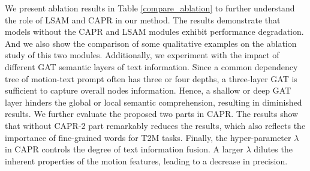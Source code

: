\documentclass[10pt,twocolumn,letterpaper]{article}
\begin{document}
\begin{table}[t]
\centering
{}

\caption{Experiment results on Harder-HumanML3D split from the HumanML3D~\cite{guo2022generating} test set. }

\label{ablation}
\end{table}
We present ablation results in Table \ref{compare_ablation} to further understand the role of LSAM and CAPR in our method. The results demonstrate that models without the CAPR and LSAM modules exhibit performance degradation. And we also show the comparison of some qualitative examples on the ablation study of this two modules. Additionally, we experiment with the impact of different GAT semantic layers of text information. Since a common dependency tree of motion-text prompt often has three or four depths, a three-layer GAT is sufficient to capture overall nodes information. Hence, a shallow or deep GAT layer hinders the global or local semantic comprehension, resulting in diminished results. We further evaluate the proposed two parts in CAPR. The results show that without CAPR-2 part remarkably reduces the results, which also reflects the importance of fine-grained words for T2M tasks. Finally, the hyper-parameter $\lambda$ in CAPR controls the degree of text information fusion. A larger $\lambda$ dilutes the inherent properties of the motion features, leading to a decrease in precision.
\end{document}
